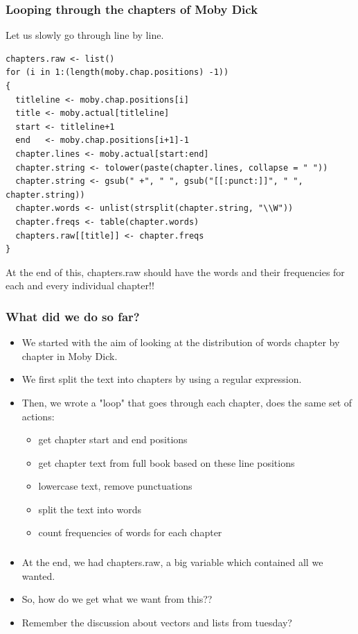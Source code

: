 \documentclass{beamer}
\begin{document}
\begin{frame}[fragile]
\frametitle{Looping through the chapters of Moby Dick}
Let us slowly go through line by line.
\tiny
\begin{verbatim}
chapters.raw <- list()
for (i in 1:(length(moby.chap.positions) -1))
{
  titleline <- moby.chap.positions[i]
  title <- moby.actual[titleline]
  start <- titleline+1
  end   <- moby.chap.positions[i+1]-1
  chapter.lines <- moby.actual[start:end]
  chapter.string <- tolower(paste(chapter.lines, collapse = " "))
  chapter.string <- gsub(" +", " ", gsub("[[:punct:]]", " ", chapter.string))
  chapter.words <- unlist(strsplit(chapter.string, "\\W"))
  chapter.freqs <- table(chapter.words)
  chapters.raw[[title]] <- chapter.freqs
}
\end{verbatim}
\normalsize At the end of this, chapters.raw should have the words and their frequencies for each and every individual chapter!!
\end{frame}

\begin{frame}
\frametitle{What did we do so far?}
\begin{itemize}
\item We started with the aim of looking at the distribution of words chapter by chapter in Moby Dick.
\item We first split the text into chapters by using a regular expression.
\item Then, we wrote a "loop" that goes through each chapter, does the same set of actions:  
\begin{itemize}
\item get chapter start and end positions
\item get chapter text from full book based on these line positions 
\item lowercase text, remove punctuations
\item split the text into words
\item count frequencies of words for each chapter
\end{itemize}
\end{itemize}
\end{frame}

\begin{frame}
\frametitle{}
\begin{itemize}
\item At the end, we had chapters.raw, a big variable which contained all we wanted.
\item So, how do we get what we want from this??
\item Remember the discussion about vectors and lists from tuesday?
\end{itemize}
\end{frame}
\end{document}
